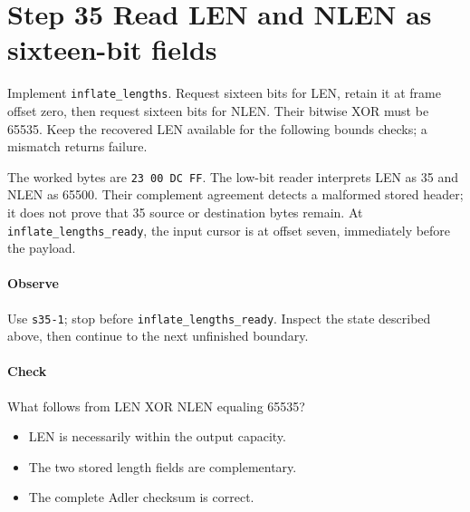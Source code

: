 \section{Step 35 Read LEN and NLEN as sixteen-bit fields}\label{png-inflate-s35}
Implement \texttt{inflate\_lengths}. Request sixteen bits for LEN, retain it at frame offset zero, then request sixteen bits for NLEN. Their bitwise XOR must be 65535. Keep the recovered LEN available for the following bounds checks; a mismatch returns failure.

The worked bytes are \texttt{23 00 DC FF}. The low-bit reader interprets LEN as 35 and NLEN as 65500. Their complement agreement detects a malformed stored header; it does not prove that 35 source or destination bytes remain. At \texttt{inflate\_lengths\_ready}, the input cursor is at offset seven, immediately before the payload.

\paragraph{Observe} Use \texttt{s35-1}; stop before \texttt{inflate\_lengths\_ready}. Inspect the state described above, then continue to the next unfinished boundary.

\paragraph{Check} What follows from LEN XOR NLEN equaling 65535?
\begin{itemize}
\item[A.] LEN is necessarily within the output capacity.
\item[B.] The two stored length fields are complementary.
\item[C.] The complete Adler checksum is correct.
\end{itemize}
